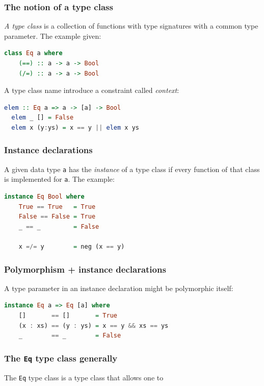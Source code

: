 \documentclass[10pt,pdf,utf8,russian,aspectratio=169]{beamer}
\begin{document}
\begin{frame}[fragile]
  \frametitle{The notion of a type class}

  \emph{A type class} is a collection of functions with type signatures with a common type parameter. The example given:

  \begin{lstlisting}[language=Haskell]
  class Eq a where
    (==) :: a -> a -> Bool
    (/=) :: a -> a -> Bool
  \end{lstlisting}

  \vspace{\baselineskip}

  A type class name introduce a constraint called \emph{context}:

  \begin{lstlisting}[language=Haskell]
  elem :: Eq a => a -> [a] -> Bool
  elem _ [] = False
  elem x (y:ys) = x == y || elem x ys
  \end{lstlisting}
\end{frame}

\begin{frame}[fragile]
  \frametitle{Instance declarations}

  A given data type \verb"a" has the \emph{instance} of a type class if every function of that class is implemented for \verb"a". The example:

  \begin{lstlisting}[language=Haskell]
  instance Eq Bool where
    True == True   = True
    False == False = True
    _ == _         = False

    x =/= y        = neg (x == y)
  \end{lstlisting}
\end{frame}

\begin{frame}[fragile]
  \frametitle{Polymorphism + instance declarations}

  A type parameter in an instance declaration might be polymorphic itself:

  \begin{lstlisting}[language=Haskell]
  instance Eq a => Eq [a] where
    []       == []       = True
    (x : xs) == (y : ys) = x == y && xs == ys
    _        == _        = False
  \end{lstlisting}
\end{frame}

\begin{frame}
  \frametitle{The \verb"Eq" type class generally}

  The \verb"Eq" type class is a type class that allows one to
\end{frame}
\end{document}

